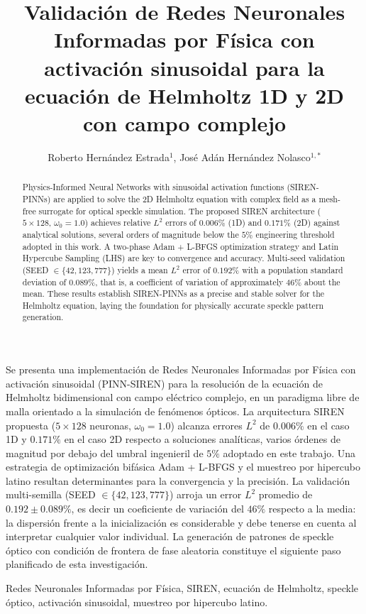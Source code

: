 \documentclass[spanish]{cys}
\title{Validación de Redes Neuronales Informadas por Física con
       activación sinusoidal para la ecuación de Helmholtz 1D y 2D
       con campo complejo}
\author{Roberto Hernández Estrada$^1$, José Adán Hernández Nolasco$^{1,*}$}
\affil{
$^1$ Universidad Juárez Autónoma de Tabasco, División Académica de Ciencias Básicas,
Cunduacán, \authorcr
México \authorcr \authorcr
robertohernandezestrd@gmail.com, jose.hernandez@ujat.mx \authorcr \authorcr
}
\begin{document}
\maketitle
\renewcommand{\tablename}{Tabla}

\begin{resumen}
Se presenta una implementación de Redes Neuronales Informadas por Física con
activación sinusoidal (PINN-SIREN) para la resolución de la ecuación de Helmholtz
bidimensional con campo eléctrico complejo, en un paradigma libre de malla orientado
a la simulación de fenómenos ópticos.
La arquitectura SIREN propuesta ($5 \times 128$ neuronas, $\omega_0 = 1.0$)
alcanza errores $L^2$ de $0.006\%$ en el caso 1D y $0.171\%$ en el caso 2D
respecto a soluciones analíticas, varios órdenes de magnitud por debajo del
umbral ingenieril de $5\%$ adoptado en este trabajo.
Una estrategia de optimización bifásica Adam + L-BFGS y el muestreo por hipercubo
latino resultan determinantes para la convergencia y la precisión.
La validación multi-semilla (SEED $\in \{42, 123, 777\}$) arroja un error
$L^2$ promedio de $0.192 \pm 0.089\%$, es decir un coeficiente de variación del
$46\%$ respecto a la media: la dispersión frente a la inicialización es
considerable y debe tenerse en cuenta al interpretar cualquier valor
individual.
La generación de patrones de speckle óptico con condición de frontera de fase
aleatoria constituye el siguiente paso planificado de esta investigación.
\end{resumen}

\begin{palabrasclave}
Redes Neuronales Informadas por Física, SIREN, ecuación de Helmholtz, speckle
óptico, activación sinusoidal, muestreo por hipercubo latino.
\end{palabrasclave}


\begin{abstract}
Physics-Informed Neural Networks with sinusoidal activation functions (SIREN-PINNs)
are applied to solve the 2D Helmholtz equation with complex field as a mesh-free
surrogate for optical speckle simulation.
The proposed SIREN architecture ($5 \times 128$, $\omega_0 = 1.0$) achieves relative
$L^2$ errors of $0.006\%$ (1D) and $0.171\%$ (2D) against analytical solutions,
several orders of magnitude below the $5\%$ engineering threshold adopted in this
work.
A two-phase Adam + L-BFGS optimization strategy and Latin Hypercube Sampling (LHS)
are key to convergence and accuracy.
Multi-seed validation (SEED $\in \{42, 123, 777\}$) yields a mean $L^2$ error of
$0.192\%$ with a population standard deviation of $0.089\%$, that is, a
coefficient of variation of approximately $46\%$ about the mean.
These results establish SIREN-PINNs as a precise and stable solver for the Helmholtz
equation, laying the foundation for physically accurate speckle pattern generation.
\end{abstract}
\end{document}
